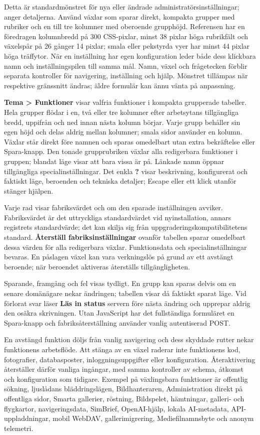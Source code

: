 \documentclass[11pt,a4paper]{article}
\newcommand{\ui}[1]{\textbf{#1}}
\begin{document}
Detta är standardmönstret för nya eller ändrade administratörsinställningar;
 anger detaljerna. Använd växlar som sparar direkt,
kompakta grupper med rubriker och en till tre kolumner med oberoende grupphöjd.
Referensen har en föredragen kolumnbredd på 300 CSS-pixlar, minst 38 pixlar höga
rubrikfält och växelspår på 26 gånger 14 pixlar; smala eller pekstyrda vyer har
minst 44 pixlar höga träffytor. När en inställning har egen konfiguration leder
både dess klickbara namn och inställningspilen till samma mål. Namn, växel och
frågetecken förblir separata kontroller för navigering, inställning och hjälp.
Mönstret tillämpas när respektive gränssnitt ändras; äldre formulär kan ännu
vänta på anpassning.

\ui{Tema > Funktioner} visar valfria funktioner i kompakta grupperade tabeller.
Hela grupper flödar i en, två eller tre kolumner efter arbetsytans tillgängliga
bredd, uppifrån och ned innan nästa kolumn börjar. Varje grupp behåller sin
egen höjd och delas aldrig mellan kolumner; smala sidor använder en kolumn.
Växlar står direkt före namnen och sparas omedelbart utan extra bekräftelse
eller Spara-knapp. Den tonade grupprubriken växlar alla redigerbara funktioner i
gruppen; blandat läge visar att bara vissa är på. Länkade namn öppnar
tillgängliga specialinställningar. Det enkla \ui{?} visar beskrivning,
konfigurerat och faktiskt läge, beroenden och tekniska detaljer; Escape eller
ett klick utanför stänger hjälpen.

Varje rad visar fabriksvärdet och om den sparade inställningen avviker.
Fabriksvärdet är det uttryckliga standardvärdet vid nyinstallation, annars
registrets standardvärde; det kan skilja sig från uppgraderingskompatibilitetens
standard. \ui{Återställ fabriksinställningar} ovanför tabellen sparar omedelbart
dessa värden för alla redigerbara växlar. Funktionsdata och specialinställningar
bevaras. En påslagen växel kan vara verkningslös på grund av ett avstängt
beroende; när beroendet aktiveras återställs tillgängligheten.

Sparande, framgång och fel visas tydligt. En grupp kan sparas delvis om en
senare domänägare nekar ändringen; tabellen visar då faktiskt sparat läge. Vid
förlorat svar läser \ui{Läs in status} servern före nästa ändring och upprepar
aldrig den osäkra skrivningen. Utan JavaScript har det fullständiga formuläret
en Spara-knapp och fabriksåterställning använder vanlig autentiserad POST.

En avstängd funktion döljs från vanlig navigering och dess skyddade rutter nekar
funktionens arbetsflöde. Att stänga av en växel raderar inte funktionens kod,
fotografier, databasposter, inloggningsuppgifter eller konfiguration.
Återaktivering återställer därför vanliga ingångar, med samma kontroller av
schema, åtkomst och konfiguration som tidigare. Exempel på växlingsbara
funktioner är offentlig sökning, ljuslådans bläddringslägen, Bildhanteraren,
Administration direkt på offentliga sidor, Smarta gallerier, röstning,
Bildspelet, hämtningar, galleri- och flygkartor, navigeringsdata, SimBrief,
OpenAI-hjälp, lokala AI-metadata, API-uppladdningar, mobil WebDAV,
gallerimigrering, Mediefilnamnsbyte och anonym telemetri.
\end{document}
